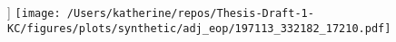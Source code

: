 \begin{figure}[h]]
\centering
\texttt{[image: /Users/katherine/repos/Thesis-Draft-1-KC/figures/plots/synthetic/adj\_eop/197113\_332182\_17210.pdf]}
\caption{}
\label{fig:}
\end{figure}
